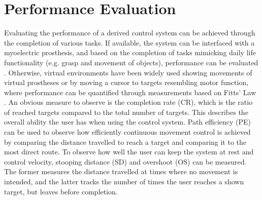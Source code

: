 \section{Performance Evaluation}

Evaluating the performance of a derived control system can be achieved through the completion of various tasks. If available, the system can be interfaced with a myoelectric prosthesis, and based on the completion of tasks mimicking daily life functionality (e.g. grasp and movement of objects), performance can be evaluated \cite{Mastinu2018}. Otherwise, virtual environments have been widely used showing movements of virtual prostheses \cite{Powell2014} or by moving a cursor to targets resembling motor function, where performance can be quantified through measurements based on Fitts' Law \cite{Scheme2013,Wurth2014,Hahne2014}. An obvious measure to observe is the completion rate (CR), which is the ratio of reached targets compared to the total number of targets. This describes the overall ability the user has when using the control system. Path efficiency (PE) can be used to observe how efficiently continuous movement control is achieved by comparing the distance travelled to reach a target and comparing it to the most direct route. To observe how well the user can keep the system at rest and control velocity, stooping distance (SD) and overshoot (OS) can be measured. The former measures the distance travelled at times where no movement is intended, and the latter tracks the number of times the user reaches a shown target, but leaves before completion. \cite{Scheme2013}
